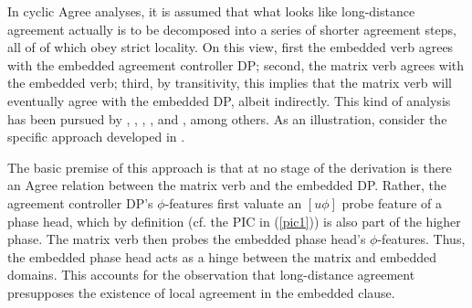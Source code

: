 \documentclass[output=paper
,modfonts
,nonflat]{langsci/langscibook}
\begin{document}
	In cyclic Agree analyses, it is assumed that what looks like long-distance
	agreement actually is to be decomposed into a series of shorter
	agreement steps, all of of which obey strict locality. On this view,
	first the embedded verb agrees with the embedded agreement controller
	DP; second, the matrix verb agrees with the embedded verb; third, by
	transitivity, this implies that the matrix verb will eventually agree
	with the embedded DP, albeit indirectly. This kind of analysis has
	been pursued by \cite{Butt:95}, \cite{Legate:05:pha}, \cite{Keine:08},
	\cite{Preminger:09}, and \cite{Lahne:12}, among others. As an
	illustration, consider the specific approach developed in
	\cite{Legate:05:pha}.
	
	The basic premise of this approach is that at no stage of the
	derivation is there an Agree relation between the matrix verb and the
	embedded DP.  Rather, the agreement controller DP's $\phi$-features
	first valuate an $[u\phi]$ probe feature of a phase head, which by
	definition (cf. the PIC in (\ref{pic1})) is also part of the higher
	phase.  The matrix verb then probes the embedded phase head's
	$\phi$-features.  Thus, the embedded phase head acts as a hinge
	between the matrix and embedded domains.  This accounts for the
	observation that long-distance agreement presupposes the existence of
	local agreement in the embedded clause. 
	
\end{document}
